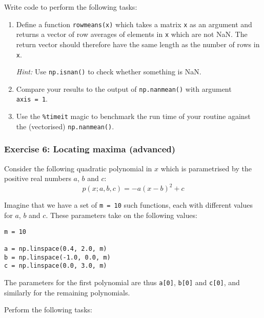 \documentclass[10pt]{scrartcl}
\begin{document}
Write code to perform the following tasks:

\begin{enumerate}
\def\labelenumi{\arabic{enumi}.}
\item
  Define a function \texttt{rowmeans(x)} which takes a matrix \texttt{x}
  as an argument and returns a vector of row averages of elements in
  \texttt{x} which are not NaN. The return vector should therefore have
  the same length as the number of rows in \texttt{x}.

  \emph{Hint:} Use \texttt{np.isnan()} to check whether something is
  NaN.
\item
  Compare your results to the output of \texttt{np.nanmean()} with
  argument \texttt{axis\ =\ 1}.
\item
  Use the \texttt{\%timeit} magic to benchmark the run time of your
  routine against the (vectorised) \texttt{np.nanmean()}.
\end{enumerate}

    \hypertarget{exercise-6-locating-maxima-advanced}{%
\subsubsection{Exercise 6: Locating maxima
(advanced)}\label{exercise-6-locating-maxima-advanced}}

Consider the following quadratic polynomial in \(x\) which is
parametrised by the positive real numbers \(a\), \(b\) and \(c\): \[
p(x;a,b,c) = -a (x-b)^2 + c
\]

Imagine that we have a set of \texttt{m\ =\ 10} such functions, each
with different values for \(a\), \(b\) and \(c\). These parameters take
on the following values:

\begin{verbatim}
m = 10

a = np.linspace(0.4, 2.0, m)
b = np.linspace(-1.0, 0.0, m)
c = np.linspace(0.0, 3.0, m)
\end{verbatim}

The parameters for the first polynomial are thus \texttt{a{[}0{]}},
\texttt{b{[}0{]}} and \texttt{c{[}0{]}}, and similarly for the remaining
polynomials.

Perform the following tasks:
\end{document}
